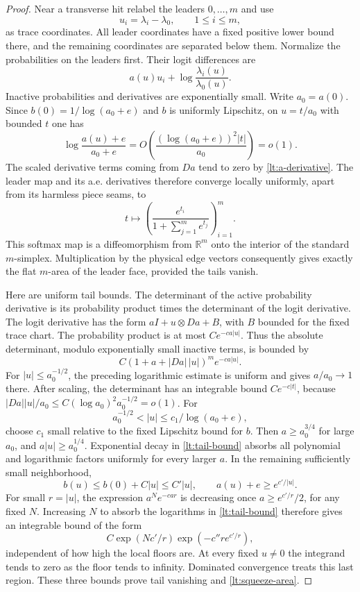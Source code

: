 \documentclass[11pt]{article}
\numberwithin{equation}{section}
\theoremstyle{definition}
\theoremstyle{remark}
\newcommand{\R}{\mathbb R}
\begin{document}
\begin{proof}
Near a transverse hit relabel the leaders $0,\ldots,m$ and use
\[
 u_i=\lambda_i-\lambda_0,\qquad 1\leq i\leq m,
\]
as trace coordinates.  All leader coordinates have a fixed positive
lower bound there, and the remaining coordinates are separated below
them.  Normalize the probabilities on the leaders first.  Their
logit differences are
\[
 a(u)u_i+\log\frac{\lambda_i(u)}{\lambda_0(u)}.
\]
Inactive probabilities and derivatives are exponentially small.
Write $a_0=a(0)$.  Since
$b(0)=1/\log(a_0+e)$ and $b$ is uniformly Lipschitz, on
$u=t/a_0$ with bounded $t$ one has
\[
 \log\frac{a(u)+e}{a_0+e}
       =O\left(\frac{(\log(a_0+e))^2|t|}{a_0}\right)=o(1).
\]
The scaled derivative terms coming from $Da$ tend to zero by
\eqref{lt:a-derivative}.  The leader map and its a.e. derivatives
therefore converge locally uniformly, apart from its harmless
piece seams, to
\[
 t\longmapsto
 \left(\frac{e^{t_i}}{1+\sum_{j=1}^m e^{t_j}}\right)_{i=1}^m.
\]
This softmax map is a diffeomorphism from $\R^m$ onto the interior
of the standard $m$-simplex.  Multiplication by the physical edge
vectors consequently gives exactly the flat $m$-area of the leader
face, provided the tails vanish.

Here are uniform tail bounds.  The determinant of the active
probability derivative is its probability product times the
determinant of the logit derivative.  The logit derivative has the
form $aI+u\otimes Da+B$, with $B$ bounded for the fixed trace chart.
The probability product is at most $C e^{-ca|u|}$.  Thus the
absolute determinant, modulo exponentially small inactive terms,
is bounded by
\begin{equation}
 C(1+a+|Da|\,|u|)^m e^{-ca|u|}.
 \label{lt:tail-bound}
\end{equation}
For $|u|\leq a_0^{-1/2}$, the preceding logarithmic estimate is
uniform and gives $a/a_0\to1$ there.  After scaling, the
determinant has an integrable bound $Ce^{-c|t|}$, because
$|Da||u|/a_0\leq C(\log a_0)^2a_0^{-1/2}=o(1)$.
For
\[
 a_0^{-1/2}<|u|\leq c_1/\log(a_0+e),
\]
choose $c_1$ small relative to the fixed Lipschitz bound for $b$.
Then $a\geq a_0^{3/4}$ for large $a_0$, and
$a|u|\geq a_0^{1/4}$.  Exponential decay in
\eqref{lt:tail-bound} absorbs all polynomial and logarithmic
factors uniformly for every larger $a$.
In the remaining sufficiently small neighborhood,
\[
 b(u)\leq b(0)+C|u|\leq C'|u|,
 \qquad a(u)+e\geq e^{c'/|u|}.
\]
For small $r=|u|$, the expression $a^N e^{-car}$ is decreasing
once $a\geq e^{c'/r}/2$, for any fixed $N$.  Increasing $N$ to
absorb the logarithms in \eqref{lt:tail-bound} therefore gives an
integrable bound of the form
\[
 C\exp(Nc'/r)\exp(-c''r e^{c'/r}),
\]
independent of how high the local floors are.  At every fixed
$u\ne0$ the integrand tends to zero as the floor tends to infinity.
Dominated convergence treats this last region.  These three bounds
prove tail vanishing and \eqref{lt:squeeze-area}.


\end{proof}
\end{document}
